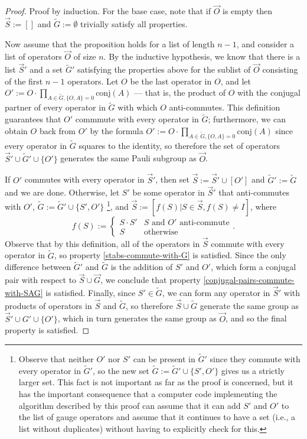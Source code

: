 \documentclass[twocolumn,showpacs,preprintnumbers,amsmath,amssymb,nofootinbib,pra,floatfix]{revtex4}
\newcommand{\lst}{\vec}
\newcommand{\set}{\tilde}
\begin{document}
\begin{proof}
Proof by induction.  For the base case, note that if $\lst O$ is empty then $\lst S := []$ and $\set G:=\emptyset$ trivially satisfy all properties.

Now assume that the proposition holds for a list of length $n-1$, and consider a list of operators $\lst O$ of size $n$.  By the inductive hypothesis, we know that there is a list $\lst S'$ and a set $\set G'$ satisfying the properties above for the sublist of $\lst O$ consisting of the first $n-1$ operators.  Let $O$ be the last operator in $O$, and let $O':=O\cdot \prod_{A\in \set G, \{O,A\}=0} \text{conj}(A)$ --- that is, the product of $O$ with the conjugal partner of every operator in $\set G$ with which $O$ anti-commutes.  This definition guarantees that $O'$ commmute with every operator in $\set G$;  furthermore, we can obtain $O$ back from $O'$ by the formula $O':=O\cdot \prod_{A\in \set G, \{O,A\}=0} \text{conj}(A)$ since every operator in $\set G$ squares to the identity, so therefore the set of operators $\lst S' \cup \set G' \cup \{O'\}$ generates the same Pauli subgroup as $\lst O$.

If $O'$ commutes with every operator in $\lst S'$, then set $\lst S := \lst S' \cup [O']$ and $\set G' := \set G$ and we are done.  Otherwise, let $S'$ be some operator in $\lst S'$ that anti-commutes with $O'$, $\set G:=\set G'\cup \{S',O'\}$
\footnote{Observe that neither $O'$ nor $S'$ can be present in $\set G'$ since they commute with every operator in $\set G'$, so the new set $\set G:=\set G'\cup \{S',O'\}$ gives us a strictly larger set.  This fact is not important as far as the proof is concerned, but it has the important consequence that a computer code implementing the algorithm described by this proof can assume that it can add $S'$ and $O'$ to the list of gauge operators and assume that it continues to have a set (i.e., a list without duplicates) without having to explicitly check for this.}, and $\lst S := [f(S) | S \in \lst S, f(S) \ne I]$, where
$$
f(S) :=
\begin{cases}
S\cdot S' & \text{$S$ and $O'$ anti-commute}\\
S & \text{otherwise}
\end{cases}.
$$
Observe that by this definition, all of the operators in $\lst S$ commute with every operator in $\set G$, so property \ref{stabs-commute-with-G} is satisfied.  Since the only difference between $\set G'$ and $\set G$ is the addition of $S'$ and $O'$, which form a conjugal pair with respect to $\lst S \cup \lst G$, we conclude that property \ref{conjugal-pairs-commute-with-SAG} is satisfied.
Finally, since $S'\in \set G$, we can form any operator in $\lst S'$ with products of operators in $\lst S$ and $\set G$, so therefore $\lst S \cup \set G$ generate the same group as $\lst S' \cup G' \cup \{O'\}$, which in turn generates the same group as $\lst O$, and so the final property is satisfied.
\end{proof}
\end{document}
